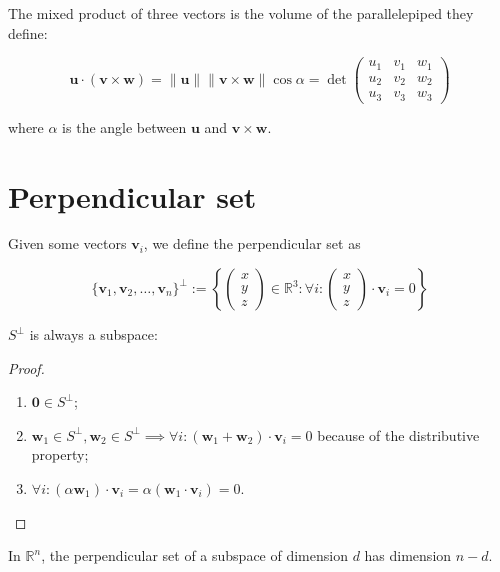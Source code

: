 \documentclass[12pt,a4paper]{report}
\newcommand{\norm}[1]{\left\lVert#1\right\rVert}
\numberwithin{equation}{section}
\theoremstyle{definition}
\theoremstyle{remark}
\begin{document}
The mixed product of three vectors is the volume of the parallelepiped they define:

\begin{equation}
\mathbf{u} \cdot (\mathbf{v}\times\mathbf{w}) =
\norm{\mathbf{u}} \norm{\mathbf{v} \times \mathbf{w}}\cos \alpha
=\det \begin{pmatrix}
u_1 & v_1 & w_1 \\
u_2 & v_2 & w_2 \\
u_3 & v_3 & w_3
\end{pmatrix}
\end{equation}

where $\alpha$ is the angle between $\mathbf{u}$ and $\mathbf{v}\times\mathbf{w}$.

\section{Perpendicular set}

Given some vectors $\mathbf{v}_i$, we define the perpendicular set as

\begin{equation}
\lbrace \mathbf{v}_1, \mathbf{v}_2, \dots, \mathbf{v}_n\rbrace ^\perp := \left\lbrace \begin{pmatrix}
x\\y\\z
\end{pmatrix}\in \mathbb{R}^3: \forall i: \begin{pmatrix}
x\\y\\z
\end{pmatrix} \cdot \mathbf{v}_i =0\right\rbrace
\end{equation}

$S^\perp$ is always a subspace:

\begin{proof}
\begin{enumerate}
\item $\mathbf{0} \in S^\perp$;
\item $\mathbf{w}_1 \in S^\perp, \mathbf{w}_2 \in S^\perp \implies \forall i: (\mathbf{w}_1 + \mathbf{w}_2)\cdot \mathbf{v}_i = 0$ because of the distributive property;
\item $\forall i: (\alpha \mathbf{w}_1) \cdot \mathbf{v}_i = \alpha (\mathbf{w}_1 \cdot \mathbf{v}_i) = 0$.
\end{enumerate}
\end{proof}

In $\mathbb{R}^n$, the perpendicular set of a subspace of dimension $d$ has dimension $n-d$.
\end{document}
